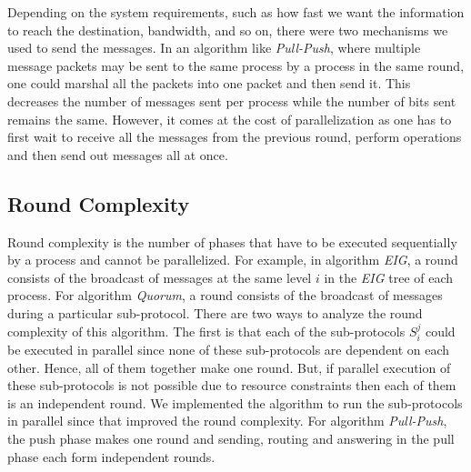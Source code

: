     Depending on the system requirements, such as how fast we want the
    information to reach the destination, bandwidth, and so on, there were two
    mechanisms we used to send the messages. In an algorithm like
    \textit{Pull-Push}, where multiple message packets may be sent to the same
    process by a process in the same round, one could marshal all the packets
    into one packet and then send it. This decreases the number of messages
    sent per process while the number of bits sent remains the same. However,
    it comes at the cost of parallelization as one has to first wait to receive
    all the messages from the previous round, perform operations and then send
    out messages all at once. 


\subsection{Round Complexity} Round complexity is the number of phases that
have to be executed sequentially by a process and cannot be parallelized. For
example, in algorithm \textit{EIG}, a round consists of the broadcast of
messages at the same level $i$ in the \textit{EIG} tree of each process. For
algorithm \textit{Quorum}, a round consists of the broadcast of messages during
a particular sub-protocol. There are two ways to analyze the round complexity
of this algorithm. The first is that each of the sub-protocols $S_i^j$ could be
executed in parallel since none of these sub-protocols are dependent on each
other. Hence, all of them together make one round. But, if parallel execution
of these sub-protocols is not possible due to resource constraints then each of
them is an independent round. We implemented the algorithm to run the
sub-protocols in parallel since that improved the round complexity. For
algorithm \textit{Pull-Push}, the push phase makes one round and sending,
routing and answering in the pull phase each form independent rounds.


